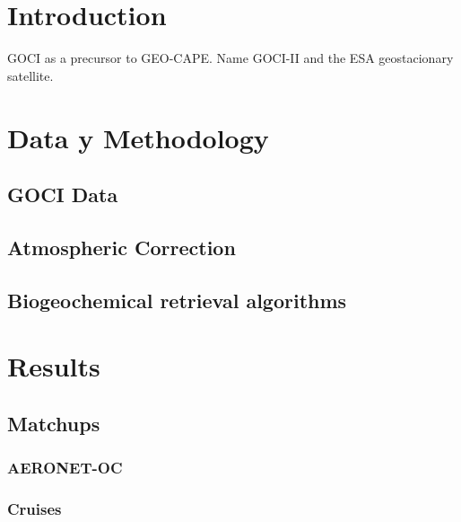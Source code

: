 \documentclass[onecolumn,3p,letterpaper,11pt]{elsarticle}
\begin{document}
\section{Introduction}
GOCI as a precursor to GEO-CAPE. 
Name GOCI-II and the ESA geostacionary satellite.


\section{Data y Methodology}
\subsection{GOCI Data}

\subsection{Atmospheric Correction}

\subsection{Biogeochemical retrieval algorithms}

\section{Results}
\label{sec:Results}
\subsection{Matchups}
\subsubsection{AERONET-OC}

\subsubsection{Cruises}
\end{document}
